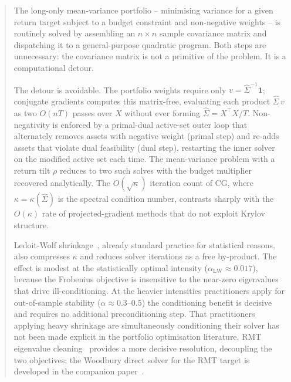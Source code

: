 \begin{abstract}
The long-only mean-variance portfolio -- minimising variance for a given return target
subject to a budget constraint and non-negative weights -- is routinely solved by
assembling an $n\times n$ sample covariance matrix and dispatching it to a
general-purpose quadratic program. Both steps are unnecessary: the covariance matrix
is not a primitive of the problem. It is a computational detour.

The detour is avoidable. The portfolio weights require only $v = \hat\Sigma^{-1}\mathbf{1}$;
conjugate gradients computes this matrix-free, evaluating each product $\hat\Sigma\,v$
as two $O(nT)$ passes over $X$ without ever forming $\hat\Sigma = X^\top X/T$.
Non-negativity is enforced by a primal-dual active-set outer loop that alternately
removes assets with negative weight (primal step) and re-adds assets that violate
dual feasibility (dual step), restarting the inner solver on the modified active set
each time. The mean-variance
problem with a return tilt $\rho$ reduces to two such solves with the budget multiplier
recovered analytically. The $O(\sqrt\kappa)$ iteration count of CG, where
$\kappa = \kappa(\hat\Sigma)$ is the spectral condition number, contrasts sharply with
the $O(\kappa)$ rate of projected-gradient methods that do not exploit Krylov structure.

Ledoit-Wolf shrinkage~\cite{ledoit2004}, already standard practice for statistical
reasons, also compresses $\kappa$ and reduces solver iterations as a free by-product.
The effect is modest at the statistically optimal intensity
($\alpha_{\mathrm{LW}} \approx 0.017$), because the Frobenius objective is insensitive
to the near-zero eigenvalues that drive ill-conditioning. At the heavier intensities
practitioners apply for out-of-sample stability ($\alpha \approx 0.3$--$0.5$) the
conditioning benefit is decisive and requires no additional preconditioning step.
That practitioners applying heavy shrinkage are simultaneously conditioning their
solver has not been made explicit in the portfolio optimisation literature.
RMT eigenvalue cleaning~\cite{laloux1999,bun2017} provides a more decisive resolution,
decoupling the two objectives; the Woodbury direct solver for the RMT target is
developed in the companion paper~\cite{schmelzer2026rmt}.


\end{abstract}
